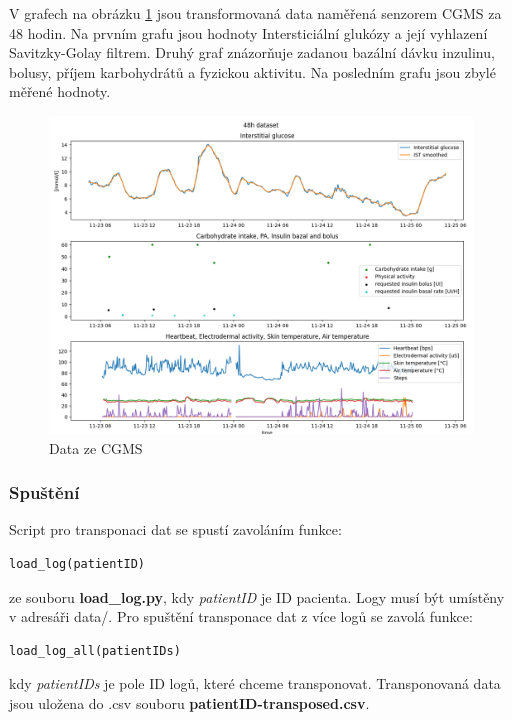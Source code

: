 V grafech na obrázku \ref{fig:48h_dataset} jsou transformovaná data naměřená senzorem CGMS za 48 hodin. Na prvním grafu jsou hodnoty Intersticiální glukózy a její vyhlazení Savitzky-Golay filtrem. Druhý graf znázorňuje zadanou bazální dávku inzulinu, bolusy, příjem karbohydrátů a fyzickou aktivitu. Na posledním grafu jsou zbylé měřené hodnoty.

\begin{figure}[H]
\caption{Data ze CGMS}
\label{fig:48h_dataset}
\centering
\includegraphics[width=1\textwidth]{img/cho/48h_dataset.png}
\end{figure}

\subsubsection{Spuštění}
Script pro transponaci dat se spustí zavoláním funkce:
\begin{verbatim}
load_log(patientID)
\end{verbatim}
ze souboru \textbf{load\_log.py}, kdy \textit{patientID} je ID pacienta. Logy musí být umístěny v adresáři data/. Pro spuštění transponace dat z více logů se zavolá funkce:
\begin{verbatim}
load_log_all(patientIDs)
\end{verbatim}
kdy \textit{patientIDs} je pole ID logů, které chceme transponovat. Transponovaná data jsou uložena do .csv souboru \textbf{patientID-transposed.csv}.

